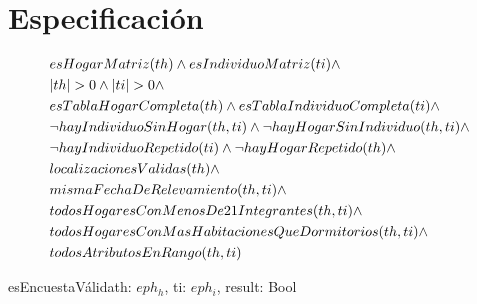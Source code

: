 \documentclass[11pt]{article}
\begin{document}


\section{Especificación}

\begin{align*}
	 & esHogarMatriz(th) \wedge esIndividuoMatriz(ti) \wedge                             \\
	 & |th| > 0 \wedge |ti| > 0 \wedge                                 \\
	 & esTablaHogarCompleta(th) \wedge esTablaIndividuoCompleta(ti) \wedge               \\
	 & \neg hayIndividuoSinHogar(th, ti) \wedge \neg hayHogarSinIndividuo(th, ti) \wedge \\
	 & \neg hayIndividuoRepetido(ti) \wedge \neg hayHogarRepetido(th) \wedge             \\
	 & localizacionesValidas(th) \wedge                                                  \\
	 & mismaFechaDeRelevamiento(th, ti) \wedge                                           \\
	 & todosHogaresConMenosDe21Integrantes(th, ti) \wedge                                \\
	 & todosHogaresConMasHabitacionesQueDormitorios(th, ti) \wedge                       \\
	 & todosAtributosEnRango(th, ti)                                                     \\
\end{align*}

\begin{proc}{esEncuestaVálida}{\In th: $eph_h$, \In ti: $eph_i$, \Out result: Bool}{}
\end{proc}




\end{document}
